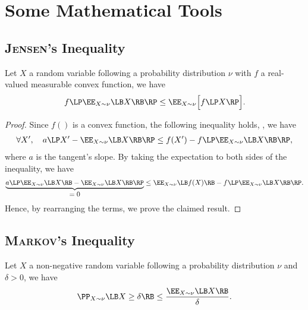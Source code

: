 \chapter{Some Mathematical Tools}

\section{\textsc{Jensen}'s Inequality}

\begin{theorem}
Let $X$ a random variable following a probability distribution $\nu$ with $f$ a real-valued measurable convex function, we have
\begin{align*}
    f\LP\EE_{X\sim\nu}\LB X\RB\RP \le \EE_{X\sim\nu}\Big[ f\LP X\RP \Big].
\end{align*}
\label{ap:tools:theorem:jensen}
\end{theorem}
\begin{noaddcontents}\begin{proof}
Since $f()$ is a convex function, the following inequality holds, \ie, we have
\begin{align*}
\forall X',\quad a\LP X' - \EE_{X\sim\nu}\LB X\RB\RP \le f(X') - f\LP\EE_{X\sim\nu}\LB X\RB\RP,
\end{align*}
where $a$ is the tangent's slope.
By taking the expectation to both sides of the inequality, we have
\begin{align*}
\underbrace{a\LP \EE_{X\sim\nu}\LB X\RB - \EE_{X\sim\nu}\LB X\RB\RP}_{\displaystyle = 0} \le \EE_{X\sim\nu}\LB f(X)\RB - f\LP\EE_{X\sim\nu}\LB X\RB\RP.
\end{align*}
Hence, by rearranging the terms, we prove the claimed result.
\end{proof}\end{noaddcontents}

\section{\textsc{Markov}'s Inequality}
\label{ap:tools:sec:markov}

\begin{theorem} Let $X$ a non-negative random variable  following a probability distribution $\nu$ and $\delta>0$, we have
\begin{align*}
    \PP_{X\sim\nu}\LB X\ge \delta\RB \le \frac{\EE_{X\sim\nu}\LB X\RB}{\delta}.
\end{align*}
\label{ap:tools:theorem:first-markov}
\end{theorem}

